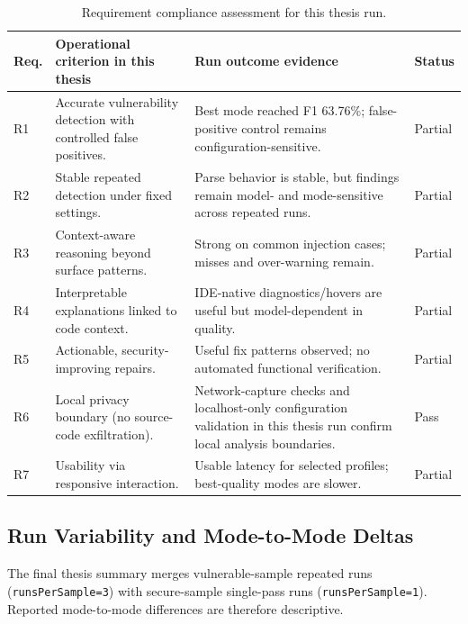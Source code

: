 \begin{table}[H]
  \centering
  \caption{Requirement compliance assessment for this thesis run.}
  \label{tab:requirement-compliance}
  \footnotesize
  \renewcommand{\arraystretch}{1.15}
  \begin{tabularx}{\textwidth}{p{}p{}p{}p{}}
    \toprule
    Req. & Operational criterion in this thesis & Run outcome evidence & Status \\
    \midrule
    R1 & Accurate vulnerability detection with controlled false positives. & Best mode reached F1 63.76\%; false-positive control remains configuration-sensitive. & Partial \\
    R2 & Stable repeated detection under fixed settings. & Parse behavior is stable, but findings remain model- and mode-sensitive across repeated runs. & Partial \\
    R3 & Context-aware reasoning beyond surface patterns. & Strong on common injection cases; misses and over-warning remain. & Partial \\
    R4 & Interpretable explanations linked to code context. & IDE-native diagnostics/hovers are useful but model-dependent in quality. & Partial \\
    R5 & Actionable, security-improving repairs. & Useful fix patterns observed; no automated functional verification. & Partial \\
    R6 & Local privacy boundary (no source-code exfiltration). & Network-capture checks and localhost-only configuration validation in this thesis run confirm local analysis boundaries. & Pass \\
    R7 & Usability via responsive interaction. & Usable latency for selected profiles; best-quality modes are slower. & Partial \\
    \bottomrule
  \end{tabularx}
\end{table}

\subsection*{Run Variability and Mode-to-Mode Deltas}

The final thesis summary merges vulnerable-sample repeated runs (\texttt{runsPerSample=3}) with secure-sample single-pass runs (\texttt{runsPerSample=1}). Reported mode-to-mode differences are therefore descriptive.


